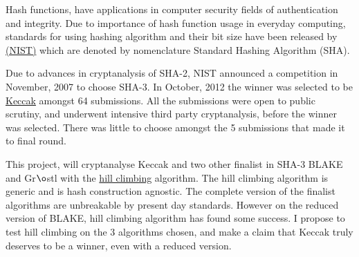\begin{abstractpage}

  Hash functions, have applications in computer security fields of authentication and integrity.
  Due to importance of hash function usage in everyday computing, standards for using hashing 
  algorithm and their bit size have been released by \href{"http://www.nist.gov/index.html"}
  {(NIST)} which are denoted by nomenclature
  Standard Hashing Algorithm (SHA).

  Due to advances in cryptanalysis of SHA-2, NIST announced a competition in November, 2007 
  to choose SHA-3. In October, 2012 the winner was selected to be \href{"http://keccak.noekeon.org/"}
  {Keccak} amongst 64 submissions. All the submissions were open to public scrutiny, and underwent
  intensive third party cryptanalysis, before the winner was selected. There was little to choose
  amongst the 5 submissions that made it to final round. 

  This project, will cryptanalyse Keccak and two other finalist in SHA-3 BLAKE and Gr$\o$stl with the 
  \href{"http://csrc.nist.gov/groups/ST/hash/sha-3/Round2/Aug2010/documents/papers/TURAN\_Paper\_Erdener.pdf"}
  {hill climbing} algorithm. The hill climbing algorithm is generic and is hash construction agnostic.
  The complete version of the finalist algorithms are unbreakable by present day standards. However
  on the reduced version of BLAKE, hill climbing algorithm has found some success. I propose to test
  hill climbing on the 3 algorithms chosen, and make a claim that Keccak truly deserves to be a winner,
  even with a reduced version.
\end{abstractpage}
